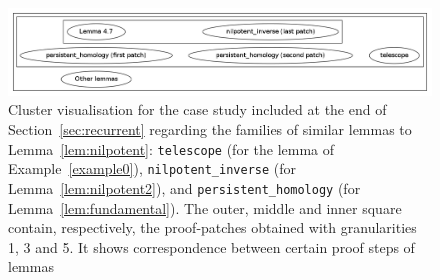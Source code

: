\begin{figure}
\centering
\includegraphics[scale=.3]{clustervisualisation.png}
\caption{Cluster visualisation for the case study included at the end of Section~\ref{sec:recurrent} regarding the families of similar lemmas to Lemma~\ref{lem:nilpotent}: \texttt{telescope} (for the lemma of Example~\ref{example0}), \texttt{nilpotent\_inverse} (for Lemma~\ref{lem:nilpotent2}), and \texttt{persistent\_homology} 
(for Lemma~\ref{lem:fundamental}). The outer, middle and inner square contain, respectively, the proof-patches obtained with granularities 1, 3 and 5. It shows correspondence between certain proof steps of lemmas %
}\label{fig:clustervisualisation} 
\end{figure} 





% 


 
 






